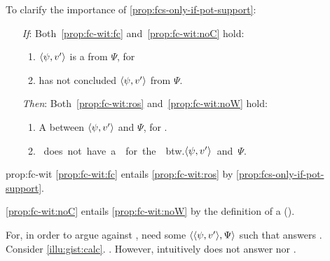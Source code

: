 \begin{note}
  To clarify the importance of \autoref{prop:fcs-only-if-pot-support}:

  \begin{proposition}
    \label{prop:fc-wit}
    \begin{itemize}
    \item[\emph{If}:]
      Both~\ref{prop:fc-wit:fc} and~\ref{prop:fc-wit:noC} hold:
      \begin{enumerate}[label=\alph*., ref=(\alph*)]
      \item
        \label{prop:fc-wit:fc}
        \(\langle \psi, v' \rangle\) is a  from \(\Psi\), for \vAgent{}
      \item
        \label{prop:fc-wit:noC}
        \vAgent{} has not concluded \(\langle \psi, v' \rangle\) from \(\Psi\).
      \end{enumerate}
    \item[\emph{Then}:]
      Both~\ref{prop:fc-wit:ros} and~\ref{prop:fc-wit:noW} hold:
      \begin{enumerate}[label=\alph*\('\)., ref=(\alph*\('\))]
      \item
        \label{prop:fc-wit:ros}
        A \ros{} between \(\langle \psi, v' \rangle\) and \(\Psi\), for \vAgent{}.
      \item
        \label{prop:fc-wit:noW}
        \vAgent{}~does~not~have~a~\wit{}~for~the~\ros{}~btw.\~\(\langle \psi, v' \rangle\)~and~\(\Psi\).
      \end{enumerate}
    \end{itemize}
    \vspace{-\baselineskip}
  \end{proposition}

  \begin{argument}{prop:fc-wit}
    \ref{prop:fc-wit:fc} entails \ref{prop:fc-wit:ros} by \autoref{prop:fcs-only-if-pot-support}.

    \noindent \ref{prop:fc-wit:noC} entails \ref{prop:fc-wit:noW} by the definition of a \wit{} (\witpage{}).
  \end{argument}

  For, in order to argue against \issueConstraint{}, need some \(\langle \langle \psi, v' \rangle, \Psi \rangle\) such that answers \qWhyV{}.
  Consider \autoref{illu:gist:calc}.
  \fc{}.
  However, intuitively does not answer \qWhy{} nor \qWhyV{}.
\end{note}


